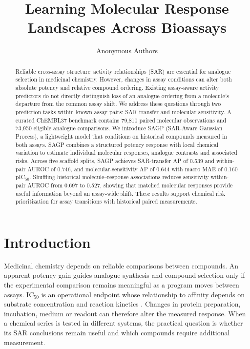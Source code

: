 \documentclass[letterpaper]{article}
\author{Anonymous Authors}
\title{Learning Molecular Response Landscapes Across Bioassays}
\date{}
\begin{document}
\maketitle
\graphicspath{{../outputs/figures/}}



\begin{abstract}
Reliable cross-assay structure--activity relationships (SAR) are essential for analogue selection in medicinal chemistry. However, changes in assay conditions can alter both absolute potency and relative compound ordering. Existing assay-aware activity predictors do not directly distinguish loss of an analogue ordering from a molecule's departure from the common assay shift. We address these questions through two prediction tasks within known assay pairs: SAR transfer and molecular sensitivity. A curated ChEMBL37 benchmark contains 79,810 paired molecular observations and 73,950 eligible analogue comparisons. We introduce SAGP (SAR-Aware Gaussian Process), a lightweight model that conditions on historical compounds measured in both assays. SAGP combines a structured potency response with local chemical variation to estimate individual molecular responses, analogue contrasts and associated risks. Across five scaffold splits, SAGP achieves SAR-transfer AP of 0.539 and within-pair AUROC of 0.746, and molecular-sensitivity AP of 0.644 with macro MAE of 0.160 pIC$_{50}$. Shuffling historical molecule--response associations reduces sensitivity within-pair AUROC from 0.697 to 0.527, showing that matched molecular responses provide useful information beyond an assay-wide shift. These results support chemical risk prioritization for assay transitions with historical paired measurements.
\end{abstract}

\section{Introduction}

Medicinal chemistry depends on reliable comparisons between compounds. An apparent potency gain guides analogue synthesis and compound selection only if the experimental comparison remains meaningful as a program moves between assays. IC$_{50}$ is an operational endpoint whose relationship to affinity depends on substrate concentration and reaction kinetics \citep{cheng1973ic50}. Changes in protein preparation, incubation, medium or readout can therefore alter the measured response. When a chemical series is tested in different systems, the practical question is whether its SAR conclusions remain useful and which compounds require additional measurement.
\end{document}
